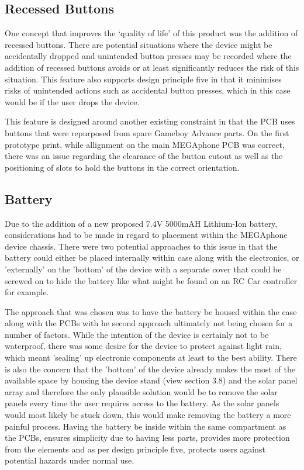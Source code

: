 \subsection{Recessed Buttons}

One concept that improves the ‘quality of life’ of this product was the addition of recessed buttons.
There are potential situations where the device might be accidentally dropped and unintended button presses may be recorded where the addition of recessed buttons avoids or at least significantly reduces the risk of this situation.
This feature also supports design principle five in that it minimises risks of unintended actions such as accidental button presses, which in this case would be if the user drops the device.

This feature is designed around another existing constraint in that the PCB uses buttons that were repurposed from spare Gameboy Advance parts. %
On the first prototype print, while allignment on the main MEGAphone PCB was correct, there was an issue regarding the clearance of the button cutout as well as the positioning of slots to hold the buttons in the correct orientation.

\subsection{Battery}

Due to the addition of a new proposed 7.4V 5000mAH Lithium-Ion battery, considerations had to be made in regard to placement within the MEGAphone device chassis.
There were two potential approaches to this issue in that the battery could either be placed internally within case along with the electronics, or 'externally' on the 'bottom' of the device with a separate cover that could be screwed on to hide the battery like what might be found on an RC Car controller for example.

The approach that was chosen was to have the battery be housed within the case along with the PCBs with he second approach ultimately not being chosen for a number of factors.
While the intention of the device is certainly not to be waterproof, there was some desire for the device to protect against light rain, which meant 'sealing' up electronic components at least to the best ability.
There is also the concern that the 'bottom' of the device already makes the most of the available space by housing the device stand (view section 3.8) and the solar panel array and therefore the only plausible solution would be to remove the solar panels every time the user requires access to the battery.
As the solar panels would most likely be stuck down, this would make removing the battery a more painful process.
Having the battery be inside within the same compartment as the PCBs, ensures simplicity due to having less parts, provides more protection from the elements and as per design principle five, protects users against potential hazards under normal use.


